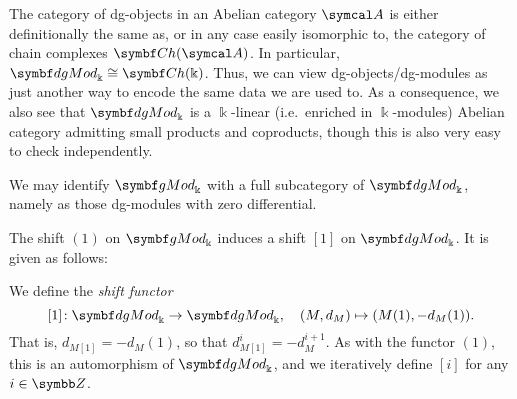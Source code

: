 \begin{remark}
	The category of dg-objects in an Abelian category \(\calA\) is either definitionally the same as, or in any case easily isomorphic to, the category of chain complexes \(\Ch(\calA)\).
	In particular, \(\dgMod_\Bbbk \cong \Ch(\Bbbk)\). Thus, we can view dg-objects/dg-modules as just another way to encode the same data we are used to. As a consequence, we also
	see that \(\dgMod_\Bbbk\) is a \(\Bbbk\)-linear (i.e.\ enriched in \(\Bbbk\)-modules) Abelian category admitting small products and coproducts, though this is also
	very easy to check independently.
\end{remark}
\begin{remark}
	We may identify \(\gMod_\Bbbk\) with a full subcategory of \(\dgMod_\Bbbk\), namely as those dg-modules with zero differential.
\end{remark}

The shift \((1)\) on \(\gMod_\Bbbk\) induces a shift \([1]\) on \(\dgMod_\Bbbk\). It is given as follows:
\begin{definition}
	We define the \emph{shift functor}
	\[ [1]\!:\dgMod_{\Bbbk} \to \dgMod_\Bbbk,\quad (M,d_M)\mapsto (M(1),-d_M(1)). \]
	That is, \(d_{M[1]} = -d_M(1)\), so that \(d_{M[1]}^i = -d_M^{i+1}\). As with the functor \((1)\), this is an automorphism of \(\dgMod_{\Bbbk}\),
	and we iteratively define \([i]\) for any \(i\in\Z\).
\end{definition}

